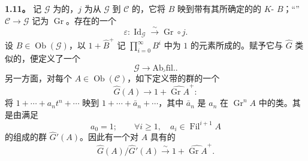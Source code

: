 \textbf{1.11。} 记 $\mathscr G$ 为的，$j$ 为从 $\mathscr G$ 到 $\mathscr C$ 的，它将 $B$ 映到带有其所确定的的 $K$- $B$；“” $\mathscr C\longrightarrow\mathscr G$ 记为 $\operatorname{Gr}$。存在的一个
\[
\varepsilon:\operatorname{Id}_{\mathscr G}\xrightarrow{\sim}\operatorname{Gr}\circ j.
\]
设 $B\in\operatorname{Ob}(\mathscr G)$，以 $1+\widehat B^+$ 记 $\prod_{i=0}^{\infty}B^i$ 中为 $1$ 的元素所成的。赋予它与 $\widehat G$ 类似的，便定义了一个
\[
\mathscr G\longrightarrow\underline{\mathrm{Ab.fil.}}.
\]
另一方面，对每个 $A\in\operatorname{Ob}(\mathscr C)$，如下定义带的群的一个
\[
\widehat G(A)\longrightarrow1+\widehat{\operatorname{Gr}A}^{+}:
\]
将 $1+\cdots+a_nt^n+\cdots$ 映到
$1+\cdots+\bar a_n+\cdots$，其中 $\bar a_n$ 是 $a_n$ 在 $\operatorname{Gr}^nA$ 中的类。其是由满足
\[
a_0=1;\qquad \forall i\geqslant1,\quad a_i\in\operatorname{Fil}^{i+1}A
\]
的组成的群 $\widehat G'(A)$。因此有一个对 $A$ 具有的
\[
\widehat G(A)/\widehat G'(A)\xrightarrow{\sim}
1+\widehat{\operatorname{Gr}A}^{+}.
\]


